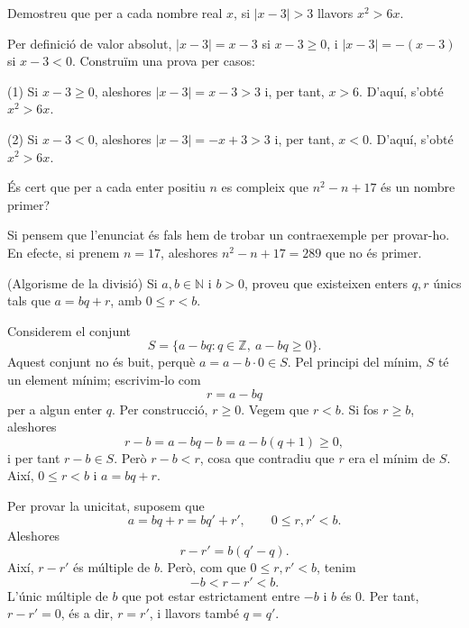 \begin{exercici}
Demostreu que per a cada nombre real $x$, si $\left\vert x-3\right\vert >3$
llavors $x^{2}>6x$.
\end{exercici}

\begin{solucio}
Per definició de valor absolut, $\left\vert x-3\right\vert =x-3$ si
$x-3\geq0$, i $\left\vert x-3\right\vert =-\left(  x-3\right)  $ si $x-3<0$.
Construïm una prova per casos:

(1) Si $x-3\geq0$, aleshores $\left\vert x-3\right\vert =x-3>3$ i, per tant,
$x>6$. D'aquí, s'obté $x^{2}>6x$.

(2) Si $x-3<0$, aleshores $\left\vert x-3\right\vert =-x+3>3$ i, per tant,
$x<0$. D'aquí, s'obté $x^{2}>6x$.
\end{solucio}

\begin{exercici}
És cert que per a cada enter positiu $n$ es compleix que $n^{2}-n+17$
és un nombre primer?
\end{exercici}

\begin{solucio}
Si pensem que l'enunciat és fals hem de trobar un contraexemple per
provar-ho. En efecte, si prenem $n=17$, aleshores $n^{2}-n+17=289$ que no
és primer.
\end{solucio}


\begin{exercici}
(Algorisme de la divisió) Si $a,b\in\mathbb{N}$ i $b>0$, proveu que existeixen enters $q,r$ únics tals que $a=bq+r$, amb $0\leq r<b$.
\end{exercici}

\begin{solucio}
Considerem el conjunt
\[
S=\{a-bq:q\in\mathbb{Z},\ a-bq\geq 0\}.
\]
Aquest conjunt no és buit, perquè $a=a-b\cdot 0\in S$. Pel principi del mínim, $S$ té un element mínim; escrivim-lo com
\[
r=a-bq
\]
per a algun enter $q$. Per construcció, $r\geq 0$. Vegem que $r<b$. Si fos $r\geq b$, aleshores
\[
r-b=a-bq-b=a-b(q+1)\geq 0,
\]
i per tant $r-b\in S$. Però $r-b<r$, cosa que contradiu que $r$ era el mínim de $S$. Així, $0\leq r<b$ i $a=bq+r$.

Per provar la unicitat, suposem que
\[
a=bq+r=bq'+r',\qquad 0\leq r,r'<b.
\]
Aleshores
\[
r-r'=b(q'-q).
\]
Així, $r-r'$ és múltiple de $b$. Però, com que $0\leq r,r'<b$, tenim
\[
-b<r-r'<b.
\]
L'únic múltiple de $b$ que pot estar estrictament entre $-b$ i $b$ és $0$. Per tant, $r-r'=0$, és a dir, $r=r'$, i llavors també $q=q'$.
\end{solucio}
